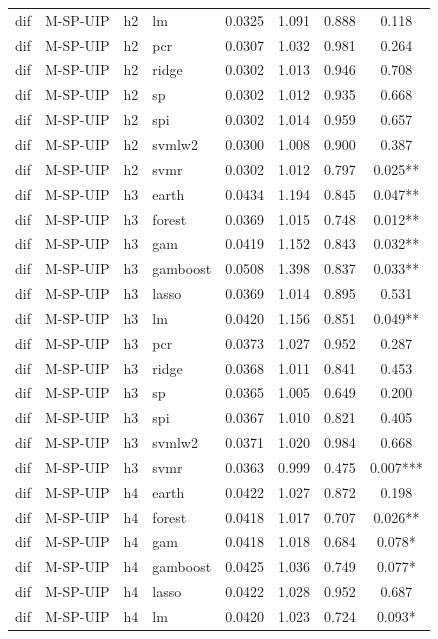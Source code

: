\begin{ThreePartTable}
\begin{longtable}[t]{llclcccc}
dif & M-SP-UIP & h2 & lm & 0.0325 & 1.091 & 0.888 & 0.118\\
dif & M-SP-UIP & h2 & pcr & 0.0307 & 1.032 & 0.981 & 0.264\\
dif & M-SP-UIP & h2 & ridge & 0.0302 & 1.013 & 0.946 & 0.708\\
dif & M-SP-UIP & h2 & sp & 0.0302 & 1.012 & 0.935 & 0.668\\
dif & M-SP-UIP & h2 & spi & 0.0302 & 1.014 & 0.959 & 0.657\\
dif & M-SP-UIP & h2 & svmlw2 & 0.0300 & 1.008 & 0.900 & 0.387\\
dif & M-SP-UIP & h2 & svmr & 0.0302 & 1.012 & 0.797 & 0.025**\\
\addlinespace
dif & M-SP-UIP & h3 & earth & 0.0434 & 1.194 & 0.845 & 0.047**\\
dif & M-SP-UIP & h3 & forest & 0.0369 & 1.015 & 0.748 & 0.012**\\
dif & M-SP-UIP & h3 & gam & 0.0419 & 1.152 & 0.843 & 0.032**\\
dif & M-SP-UIP & h3 & gamboost & 0.0508 & 1.398 & 0.837 & 0.033**\\
dif & M-SP-UIP & h3 & lasso & 0.0369 & 1.014 & 0.895 & 0.531\\
dif & M-SP-UIP & h3 & lm & 0.0420 & 1.156 & 0.851 & 0.049**\\
dif & M-SP-UIP & h3 & pcr & 0.0373 & 1.027 & 0.952 & 0.287\\
dif & M-SP-UIP & h3 & ridge & 0.0368 & 1.011 & 0.841 & 0.453\\
dif & M-SP-UIP & h3 & sp & 0.0365 & 1.005 & 0.649 & 0.200\\
dif & M-SP-UIP & h3 & spi & 0.0367 & 1.010 & 0.821 & 0.405\\
dif & M-SP-UIP & h3 & svmlw2 & 0.0371 & 1.020 & 0.984 & 0.668\\
dif & M-SP-UIP & h3 & svmr & 0.0363 & 0.999 & 0.475 & 0.007***\\
\addlinespace
dif & M-SP-UIP & h4 & earth & 0.0422 & 1.027 & 0.872 & 0.198\\
dif & M-SP-UIP & h4 & forest & 0.0418 & 1.017 & 0.707 & 0.026**\\
dif & M-SP-UIP & h4 & gam & 0.0418 & 1.018 & 0.684 & 0.078*\\
dif & M-SP-UIP & h4 & gamboost & 0.0425 & 1.036 & 0.749 & 0.077*\\
dif & M-SP-UIP & h4 & lasso & 0.0422 & 1.028 & 0.952 & 0.687\\
dif & M-SP-UIP & h4 & lm & 0.0420 & 1.023 & 0.724 & 0.093*\\

\end{longtable}
\end{ThreePartTable}
